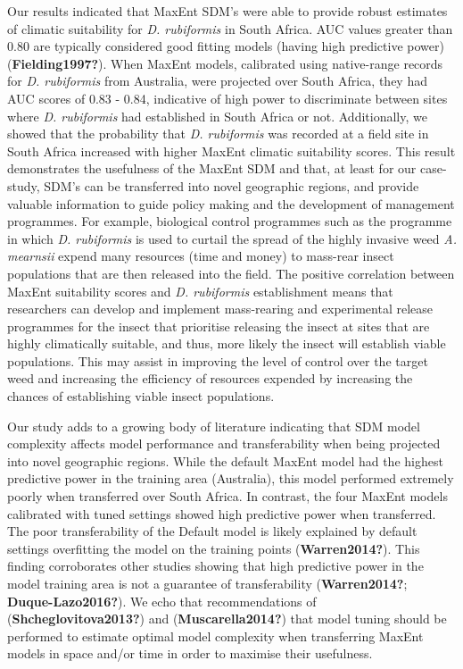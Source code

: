 \documentclass[12pt,]{article}
\begin{document}
Our results indicated that MaxEnt SDM's were able to provide robust
estimates of climatic suitability for \emph{D. rubiformis} in South
Africa. AUC values greater than 0.80 are typically considered good
fitting models (having high predictive power) (\textbf{Fielding1997?}).
When MaxEnt models, calibrated using native-range records for \emph{D.
rubiformis} from Australia, were projected over South Africa, they had
AUC scores of 0.83 - 0.84, indicative of high power to discriminate
between sites where \emph{D. rubiformis} had established in South Africa
or not. Additionally, we showed that the probability that \emph{D.
rubiformis} was recorded at a field site in South Africa increased with
higher MaxEnt climatic suitability scores. This result demonstrates the
usefulness of the MaxEnt SDM and that, at least for our case-study,
SDM's can be transferred into novel geographic regions, and provide
valuable information to guide policy making and the development of
management programmes. For example, biological control programmes such
as the programme in which \emph{D. rubiformis} is used to curtail the
spread of the highly invasive weed \emph{A. mearnsii} expend many
resources (time and money) to mass-rear insect populations that are then
released into the field. The positive correlation between MaxEnt
suitability scores and \emph{D. rubiformis} establishment means that
researchers can develop and implement mass-rearing and experimental
release programmes for the insect that prioritise releasing the insect
at sites that are highly climatically suitable, and thus, more likely
the insect will establish viable populations. This may assist in
improving the level of control over the target weed and increasing the
efficiency of resources expended by increasing the chances of
establishing viable insect populations.

Our study adds to a growing body of literature indicating that SDM model
complexity affects model performance and transferability when being
projected into novel geographic regions. While the default MaxEnt model
had the highest predictive power in the training area (Australia), this
model performed extremely poorly when transferred over South Africa. In
contrast, the four MaxEnt models calibrated with tuned settings showed
high predictive power when transferred. The poor transferability of the
Default model is likely explained by default settings overfitting the
model on the training points (\textbf{Warren2014?}). This finding
corroborates other studies showing that high predictive power in the
model training area is not a guarantee of transferability
(\textbf{Warren2014?}; \textbf{Duque-Lazo2016?}). We echo that
recommendations of (\textbf{Shcheglovitova2013?}) and
(\textbf{Muscarella2014?}) that model tuning should be performed to
estimate optimal model complexity when transferring MaxEnt models in
space and/or time in order to maximise their usefulness.
\end{document}
